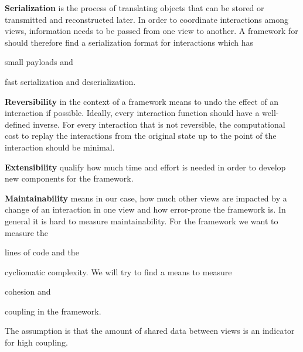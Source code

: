 \textbf{Serialization} is the process of translating objects that can be stored or transmitted and reconstructed later.
In order to coordinate interactions among views, information needs to be passed from one view to another.
A framework for \cmvs{} should therefore find a serialization format for interactions which has
\begin{enumerate*}[label=(\arabic*)]
  \item
    small payloads and
  \item 
    fast serialization and deserialization.
\end{enumerate*}

\textbf{Reversibility} in the context of a \cmv{} framework means to undo the effect of an interaction if possible.
Ideally, every interaction function should have a well-defined inverse.
For every interaction that is not reversible, the computational cost to replay the interactions from the original state up to the point of the interaction should be minimal.

\textbf{Extensibility} qualify how much time and effort is needed in order to develop new components for the \cmv{} framework.



\textbf{Maintainability} means in our case, how much other views are impacted by a change of an interaction in one view and how error-prone the framework is.
In general it is hard to measure maintainability.
For the \cmv{} framework we want to measure the
\begin{enumerate*}[label=(\arabic*)]
  \item
    lines of code and the
  \item
    cycliomatic complexity. We will try to find a means to measure
  \item
    cohesion and
  \item
    coupling in the framework.
\end{enumerate*}
The assumption is that the amount of shared data between views is an indicator for high coupling.


